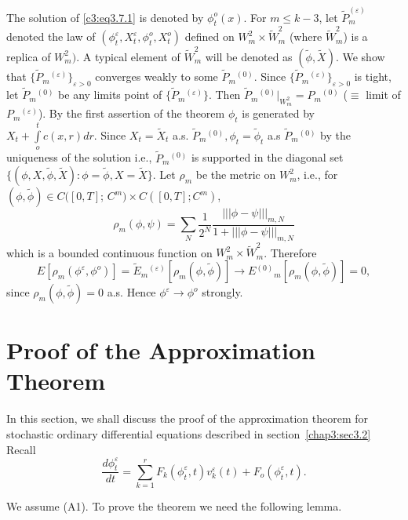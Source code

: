 The solution of \eqref{c3:eq3.7.1} is denoted by 
$\phi^o_t(x)$. For $m \le k-3$,
let $\tilde{P}_m^{(\varepsilon)} $ denoted the law of
$(\phi^\varepsilon_t, X^\varepsilon_t,\phi^o_t,X^o_t)$ defined on
$W^2_m \times \tilde{W}^2_m$ (where $\tilde{W}^2_m$) is a replica of
$ W^2_m)$. A typical element of $\tilde{W}^2_m$ will be denoted as
$(\tilde{\phi}, \tilde{X})$. We show that
$\{\tilde{P}_m{^{(\varepsilon)}}\}_{\varepsilon > 0}$ converges weakly
to some $\tilde{P}_m{^{(0)}}$. Since
$\{\tilde{P}_m{^{(\varepsilon)}}\}_{\varepsilon > 0}$ is tight, let
$\tilde{P}_m{^{(0)}}$ be any limits point of
$\{\tilde{P}_m{^{(\varepsilon)}}\}$. Then
$\tilde{P}_m{^{(0)}}|_{W^2_m} = P_m{^{(0)}}$ ($\equiv$ limit of
$P_m{^{(\varepsilon)}}$). By the first assertion of the theorem
$\phi_t$ is generated by $X_t + \int\limits_o^t c (x,r)dr$. Since $X_t
= \tilde{X}_t$ a.s. $\tilde{P}_m{^{(0)}}, \phi_t = \tilde{\phi}_t$ a.s
$\tilde{P}_m{^{(0)}}$ by the uniqueness of the solution  i.e.,
$\tilde{P}_m{^{(0)}}$ is supported in the diagonal set $\{ (\phi, X,
\tilde{\phi}, \tilde{X}): \phi = \tilde{\phi}, X = \tilde{X}\}$. Let
$\rho_m$ be the metric on $W^2_m$, i.e., for $(\phi, \tilde{\phi})
\in C ([0,T]$; $C^m) \times  C ([0,T]; C^m)$,  
$$
\rho_m (\phi, \psi) = \sum_N \frac{1}{2^N} \frac{|||\phi-
  \psi|||_{m,N}}{1 + |||\phi- \psi|||_{m,N}} 
$$
which is a bounded continuous function on $W^2_m\times
\tilde{W}^2_m$. Therefore  
$$
E\left[\rho_m (\phi^\varepsilon, \phi^o)\right] = \tilde{E}_m{^{(\varepsilon)}}
\left[\rho_m (\phi, \tilde{\phi})\right] \to E{^{(0)}}_m
\left[\rho_m(\phi, \tilde{\phi})\right] = 0,  
$$
since $\rho_m (\phi, \tilde{\phi}) = 0$ a.s. Hence $\phi^\varepsilon
\to \phi^o$ strongly. 



\section{Proof of the Approximation Theorem}\label{chap3:sec3.8}
In this section, we shall discuss the proof of the approximation
theorem for stochastic ordinary differential equations described in
section~\ref{chap3:sec3.2} Recall  
\begin{equation*}
  \frac{d \phi^\varepsilon_t}{d t} = \sum_{k=1}^r F_k
  (\phi^\varepsilon_t, t) v^\varepsilon_k (t) + F_o
  (\phi^\varepsilon_t,t). \tag{3.8.1}\label{c3:eq3.8.1} 
\end{equation*}

We assume (A1). To prove the theorem we need the following lemma.


